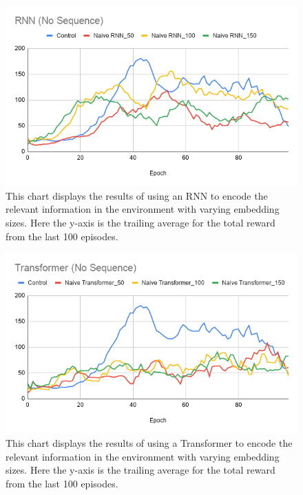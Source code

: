\documentclass[11pt, twocolumn]{article}
\begin{document}
\begin{figure}
\begin{center}
\includegraphics[scale=0.35]{naive_rnn.png}
\caption{This chart displays the results of using an RNN to encode the relevant information in the environment with varying embedding sizes. Here the y-axis is the trailing average for the total reward from the last 100 episodes.}
\label{fig:naive_rnn}
\end{center}
\end{figure}

\begin{figure}
\begin{center}
\includegraphics[scale=0.35]{naive_transformer.png}
\caption{This chart displays the results of using a Transformer to encode the relevant information in the environment with varying embedding sizes. Here the y-axis is the trailing average for the total reward from the last 100 episodes.}
\label{fig:naive_transformer}
\end{center}
\end{figure}
\end{document}
